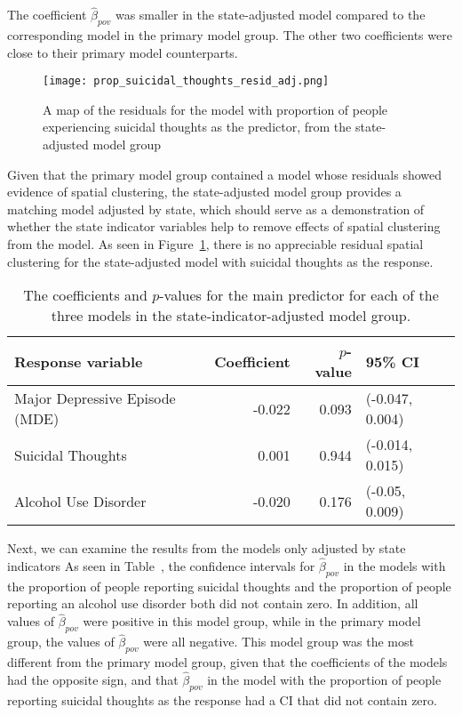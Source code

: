\documentclass{article}
\begin{document}
The coefficient $\hat{\beta}_{pov}$ was smaller
in the state-adjusted model compared to the
corresponding model in the
primary model group.
The other two coefficients were close to their
primary model counterparts.

\begin{figure}[!htb]
    \centering
    \texttt{[image: prop\_suicidal\_thoughts\_resid\_adj.png]}
    \caption{\label{fig:map-resid-adj-suicidal-thoughts}A map of the residuals
    for the model with
    proportion of people experiencing
    suicidal thoughts as the predictor,
    from the state-adjusted model group
    }
\end{figure}

Given that the primary model group contained
a model whose residuals showed evidence of spatial clustering,
the state-adjusted model group provides a matching
model adjusted by state,
which should serve as a demonstration of whether
the state indicator variables help to remove
effects of spatial clustering from the model.
As seen in Figure~\ref{fig:map-resid-adj-suicidal-thoughts},
there is no appreciable residual spatial clustering
for the state-adjusted model with
suicidal thoughts as the response.

\begin{table}[t]
\begin{center}
\begin{tabular}{l r r l}
    \toprule
    Response variable & Coefficient & $p$-value & 95\% CI\\
    \midrule
    Major Depressive Episode (MDE) & -0.022 & 0.093 & (-0.047, 0.004)\\
    Suicidal Thoughts & 0.001 & 0.944 & (-0.014, 0.015)\\
    Alcohol Use Disorder & -0.020 & 0.176 & (-0.05, 0.009)\\
    \bottomrule
\end{tabular}
\caption{\label{tab:state-ind-model-results} The coefficients and $p$-values
    for the main predictor for each of the three models
    in the state-indicator-adjusted model group.
}
\end{center}
\end{table}

Next, we can examine the results
from the models only adjusted by state indicators
As seen in Table~\label{tab:state-ind-only-model-results},
the confidence intervals for $\hat{\beta}_{pov}$
in the models with the proportion of people
reporting suicidal thoughts
and the proportion of people reporting an alcohol use disorder
both did not contain zero.
In addition, all values of $\hat{\beta}_{pov}$
were positive in this model group,
while in the primary model group,
the values of $\hat{\beta}_{pov}$
were all negative.
This model group was the most different from the primary model group,
given that the coefficients of the models had the opposite sign,
and that $\hat{\beta}_{pov}$ in the model
with the proportion of people reporting suicidal thoughts
as the response had a CI that did not contain zero.
\end{document}
